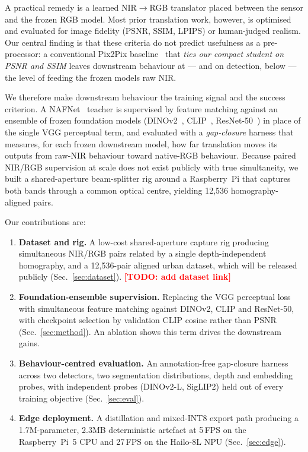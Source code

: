 \documentclass[10pt,twocolumn,letterpaper]{article}
\newcommand{\TODO}[1]{\textcolor{red}{\textbf{[TODO: #1]}}}
\begin{document}
A practical remedy is a learned NIR$\rightarrow$RGB translator placed between the sensor and the frozen RGB model. Most prior translation work, however, is optimised and evaluated for image fidelity (PSNR, SSIM, LPIPS) or human-judged realism. Our central finding is that these criteria do not predict usefulness as a pre-processor: a conventional Pix2Pix baseline~\cite{isola2017image} that \emph{ties our compact student on PSNR and SSIM} leaves downstream behaviour at --- and on detection, below --- the level of feeding the frozen models raw NIR.

We therefore make downstream behaviour the training signal and the success criterion. A NAFNet~\cite{chen2022nafnet} teacher is supervised by feature matching against an ensemble of frozen foundation models (DINOv2~\cite{oquab2024dinov2}, CLIP~\cite{radford2021clip}, ResNet-50~\cite{he2016resnet}) in place of the single VGG perceptual term, and evaluated with a \emph{gap-closure} harness that measures, for each frozen downstream model, how far translation moves its outputs from raw-NIR behaviour toward native-RGB behaviour. Because paired NIR/RGB supervision at scale does not exist publicly with true simultaneity, we built a shared-aperture beam-splitter rig around a Raspberry~Pi that captures both bands through a common optical centre, yielding 12{,}536 homography-aligned pairs.

Our contributions are:
\begin{enumerate}
  \item \textbf{Dataset and rig.} A low-cost shared-aperture capture rig producing simultaneous NIR/RGB pairs related by a single depth-independent homography, and a 12{,}536-pair aligned urban dataset, which will be released publicly (Sec.~\ref{sec:dataset}). \TODO{add dataset link}
  \item \textbf{Foundation-ensemble supervision.} Replacing the VGG perceptual loss with simultaneous feature matching against DINOv2, CLIP and ResNet-50, with checkpoint selection by validation CLIP cosine rather than PSNR (Sec.~\ref{sec:method}). An ablation shows this term drives the downstream gains.
  \item \textbf{Behaviour-centred evaluation.} An annotation-free gap-closure harness across two detectors, two segmentation distributions, depth and embedding probes, with independent probes (DINOv2-L, SigLIP2) held out of every training objective (Sec.~\ref{sec:eval}).
  \item \textbf{Edge deployment.} A distillation and mixed-INT8 export path producing a 1.7M-parameter, 2.3MB deterministic artefact at 5\,FPS on the Raspberry~Pi~5 CPU and 27\,FPS on the Hailo-8L NPU (Sec.~\ref{sec:edge}).
\end{enumerate}
\end{document}
